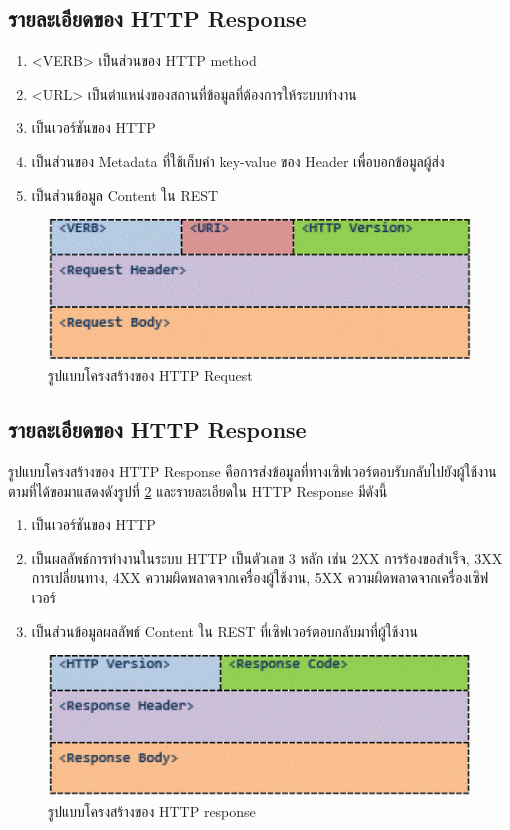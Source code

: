 	\subsection{รายละเอียดของ HTTP Response}
		\begin{enumerate}
			\item <VERB> เป็นส่วนของ HTTP method 
			\item <URL> เป็นตำแหน่งของสถานที่ข้อมูลที่ต้องการให้ระบบทำงาน
			\item <HTTP Version> เป็นเวอร์ชันของ HTTP
			\item <Request Header> เป็นส่วนของ Metadata ที่ใช้เก็บค่า key-value ของ Header เพื่อบอกข้อมูลผู้ส่ง
			\item <Request Body> เป็นส่วนข้อมูล Content ใน REST
		\end{enumerate}
		\begin{figure}
			\includegraphics[width=\columnwidth]{Figures/2/HTTP-request-structrue}
			\caption{รูปแบบโครงสร้างของ HTTP Request}
			\label{Fig:HTTP-request-structrue}
		\end{figure}

	\subsection{รายละเอียดของ HTTP Response}
		รูปแบบโครงสร้างของ HTTP Response คือการส่งข้อมูลที่ทางเซิฟเวอร์ตอบรับกลับไปยังผู้ใช้งานตามที่ได้ขอมาแสดงดังรูปที่ \ref{Fig:HTTP-response-structrue} และรายละเอียดใน HTTP Response มีดังนี้

		\begin{enumerate}
			\item <HTTP Version> เป็นเวอร์ชันของ HTTP
			\item <Response Code> เป็นผลลัพธ์การทำงานในระบบ HTTP เป็นตัวเลข 3 หลัก เช่น 2XX การร้องขอสำเร็จ, 3XX การเปลี่ยนทาง, 4XX ความผิดพลาดจากเครื่องผู้ใช้งาน, 5XX ความผิดพลาดจากเครื่องเซิฟเวอร์
			\item <Request Body> เป็นส่วนข้อมูลผลลัพธ์ Content ใน REST ที่เซิฟเวอร์ตอบกลับมาที่ผู้ใช้งาน
		\end{enumerate}
		\begin{figure}
			\includegraphics[width=\columnwidth]{Figures/2/HTTP-response-structrue}
			\caption{รูปแบบโครงสร้างของ HTTP response}
			\label{Fig:HTTP-response-structrue}
		\end{figure}

